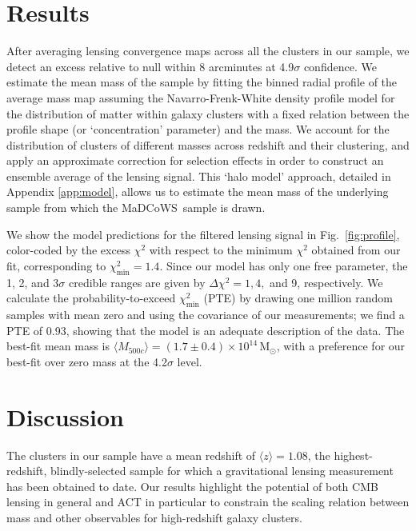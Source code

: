 \documentclass[preprint2]{aastex63}
\newcommand{\meanmass}{1.7\pm0.4}
\newcommand{\meanz}{1.08}
\newcommand{\fitpte}{0.93}
\newcommand{\fitsigma}{4.2}
\newcommand{\nullsigma}{4.9}
\newcommand{\madcows}{MaDCoWS}
\newcommand{\Msun}{\mathrm{M}_\odot}
\begin{document}
\section{Results}


After averaging lensing convergence maps across all the clusters in our sample, we detect an excess relative to null within 8 arcminutes at \nullsigma $\sigma$ confidence. We estimate the mean mass of the sample by fitting the binned radial profile of the average mass map assuming the Navarro-Frenk-White \citep[NFW,][]{NFW} density profile model for the distribution of matter within galaxy clusters with a fixed relation between the profile shape (or `concentration' parameter) and the mass. 
We account for the distribution of clusters of different masses across redshift and their clustering, and apply an approximate correction for selection effects in order to construct an ensemble average of the lensing signal. This `halo model' approach, detailed in Appendix \ref{app:model}, allows us to estimate the mean mass of the underlying sample from which the \madcows\ sample is drawn. 

We show the model predictions for the filtered lensing signal in Fig.\ \ref{fig:profile}, color-coded by the excess $\chi^2$ with respect to the minimum $\chi^2$ obtained from our fit, corresponding to $\chi^2_\mathrm{min}=1.4$. Since our model has only one free parameter, the 1, 2, and 3$\sigma$ credible ranges are given by $\Delta\chi^2=1,4,$ and 9, respectively. 
We calculate the probability-to-exceed $\chi^2_\mathrm{min}$ (PTE) by drawing one million random samples with mean zero and using the covariance of our measurements; we find a PTE of \fitpte, showing that the model is an adequate description of the data. The best-fit mean mass is $\langle M_{500c}\rangle =(\meanmass)\times10^{14}\,\Msun$, with a preference for our best-fit over zero mass at the \fitsigma $\sigma$ level.

\section{Discussion}

The clusters in our sample have a mean redshift of $\langle z\rangle=\meanz$, the highest-redshift, blindly-selected sample for which a gravitational lensing measurement has been obtained to date.
Our results highlight the potential of both CMB lensing in general and ACT in particular to constrain the scaling relation between mass and other observables for high-redshift galaxy clusters.
\end{document}

